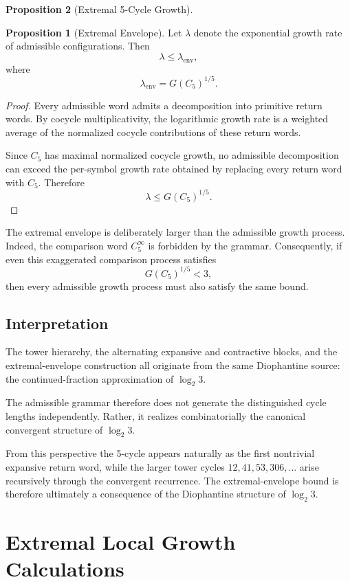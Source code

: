 \documentclass[12pt, oneside]{article}
\numberwithin{equation}{section}
\theoremstyle{definition}
\newtheorem{proposition}{Proposition}[section]
\theoremstyle{plain}
\theoremstyle{remark}
\begin{document}
\begin{proposition}[Extremal 5-Cycle Growth]
\begin{proposition}[Extremal Envelope]
Let $\lambda$ denote the exponential growth rate of admissible
configurations. Then
\[
\lambda
\le
\lambda_{\mathrm{env}},
\]
where
\[
\lambda_{\mathrm{env}}
=
G(C_5)^{1/5}.
\]
\end{proposition}

\begin{proof}
Every admissible word admits a decomposition into primitive return words.
By cocycle multiplicativity, the logarithmic growth rate is a weighted
average of the normalized cocycle contributions of these return words.

Since $C_5$ has maximal normalized cocycle growth, no admissible
decomposition can exceed the per-symbol growth rate obtained by replacing
every return word with $C_5$. Therefore
\[
\lambda
\le
G(C_5)^{1/5}.
\]
\end{proof}

The extremal envelope is deliberately larger than the admissible growth
process. Indeed, the comparison word $C_5^\infty$ is forbidden by the
grammar. Consequently, if even this exaggerated comparison process
satisfies
\[
G(C_5)^{1/5}<3,
\]
then every admissible growth process must also satisfy the same bound.

\subsection{Interpretation}

The tower hierarchy, the alternating expansive and contractive blocks,
and the extremal-envelope construction all originate from the same
Diophantine source: the continued-fraction approximation of
\(\log_2 3\).

The admissible grammar therefore does not generate the distinguished
cycle lengths independently. Rather, it realizes combinatorially the
canonical convergent structure of \(\log_2 3\).

From this perspective the 5-cycle appears naturally as the first
nontrivial expansive return word, while the larger tower cycles
\(12,41,53,306,\ldots\) arise recursively through the convergent
recurrence. The extremal-envelope bound is therefore ultimately a
consequence of the Diophantine structure of \(\log_2 3\).

\newpage
\section{Extremal Local Growth Calculations}
\label{app:local-growth-details}


\end{proposition}
\end{document}
